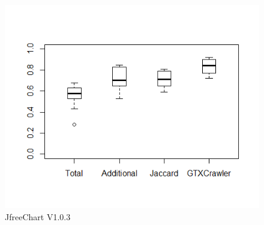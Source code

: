 \begin{figure}[!hb]
	\includegraphics[width=0.95\linewidth]{./jfree1.png}
	\caption*{JfreeChart V1.0.3}
	\label{fig:jfree2}
	\endminipage\hfill	
\end{figure}

